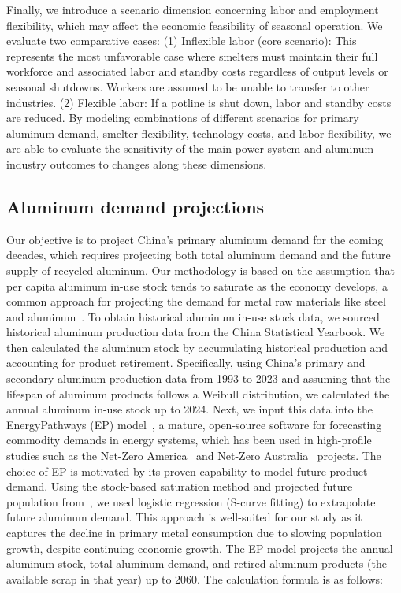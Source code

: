 \documentclass[preprint]{elsarticle}
\begin{document}
Finally, we introduce a scenario dimension concerning labor and employment flexibility, which may affect the economic feasibility of seasonal operation. We evaluate two comparative cases:
(1) Inflexible labor (core scenario): This represents the most unfavorable case where smelters must maintain their full workforce and associated labor and standby costs regardless of output levels or seasonal shutdowns. Workers are assumed to be unable to transfer to other industries. 
(2) Flexible labor: If a potline is shut down, labor and standby costs are reduced. By modeling combinations of different scenarios for primary aluminum demand, smelter flexibility, technology costs, and labor flexibility, we are able to evaluate the sensitivity of the main power system and aluminum industry outcomes to changes along these dimensions. 


\subsection*{Aluminum demand projections}\label{method_projection}

Our objective is to project China's primary aluminum demand for the coming decades, which requires projecting both total aluminum demand and the future supply of recycled aluminum. Our methodology is based on the assumption that per capita aluminum in-use stock tends to saturate as the economy develops, a common approach for projecting the demand for metal raw materials like steel and aluminum~\citep{song_mapping_2020, li_analysis_2022}. To obtain historical aluminum in-use stock data, we sourced historical aluminum production data from the China Statistical Yearbook. We then calculated the aluminum stock by accumulating historical production and accounting for product retirement. Specifically, using China's primary and secondary aluminum production data from 1993 to 2023 and assuming that the lifespan of aluminum products follows a Weibull distribution, we calculated the annual aluminum in-use stock up to 2024.
Next, we input this data into the EnergyPathways (EP) model~\citep{Farid2024}, a mature, open-source software for forecasting commodity demands in energy systems, which has been used in high-profile studies such as the Net-Zero America~\citep{larson2020net} and Net-Zero Australia~\citep{mccall2025topical} projects. The choice of EP is motivated by its proven capability to model future product demand. Using the stock-based saturation method and projected future population from~\citet{chen_provincial_2020}, we used logistic regression (S-curve fitting) to extrapolate future aluminum demand. This approach is well-suited for our study as it captures the decline in primary metal consumption due to slowing population growth, despite continuing economic growth. The EP model projects the annual aluminum stock, total aluminum demand, and retired aluminum products (the available scrap in that year) up to 2060. The calculation formula is as follows:
\end{document}
